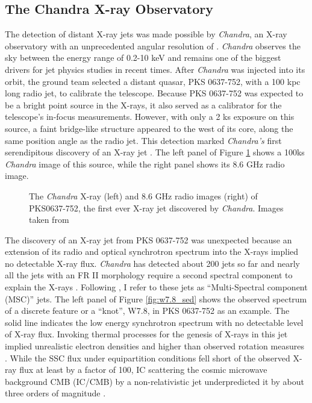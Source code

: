 \subsection{The Chandra X-ray Observatory}
The detection of distant X-ray jets was made possible by \textit{Chandra}, an X-ray observatory with an unprecedented angular resolution of \as. \textit{Chandra} observes the sky between the energy range of 0.2-10 keV and remains one of the biggest drivers for jet physics studies in recent times. After \textit{Chandra} was injected into its orbit, the ground team selected a distant quasar, PKS 0637-752, with a 100 kpc long radio jet, to calibrate the telescope. Because PKS 0637-752 was expected to be a bright point source in the X-rays, it also served as a calibrator for the telescope's in-focus measurements. However, with only a 2 ks exposure on this source, a faint bridge-like structure appeared to the west of its core, along the same position angle as the radio jet. This detection marked \textit{Chandra's} first serendipitous discovery of an X-ray jet \citep{chartas2000chandra}. The left panel of Figure \ref{fig:pks0637-752_show_piece} shows a 100ks \textit{Chandra} image of this source, while the right panel shows its 8.6 GHz radio image.

\begin{figure}
    \caption{The \textit{Chandra} X-ray (left) and 8.6 GHz radio images (right) of PKS0637-752, the first ever X-ray jet discovered by \textit{Chandra}. Images taken from \citet{chartas2000chandra}    \label{fig:pks0637-752_show_piece} }
\end{figure}
The discovery of an X-ray jet from PKS 0637-752 was unexpected because an extension of its radio and optical synchrotron spectrum into the X-rays implied no detectable X-ray flux. \textit{Chandra} has detected about 200 jets so far and nearly all the jets with an FR II morphology require a second spectral component to explain the X-rays \citep[e.g.,][]{sambruna2004survey,marshall2005chandra,2011ApJ...730...92H,2011ApJS..193...15M,marshall2018x}. Following \citep{breiding2017fermi}, I refer to these jets as ``Multi-Spectral component (MSC)'' jets. The left panel of Figure \ref{fig:w7.8_sed} shows the observed spectrum of a discrete feature or a ``knot'', W7.8, in PKS 0637-752 as an example. The solid line indicates the low energy synchrotron spectrum with no detectable level of X-ray flux. Invoking thermal processes for the genesis of X-rays in this jet implied unrealistic electron densities and higher than observed rotation measures \citep{schwartz2000chandra}. While the SSC flux under equipartition conditions fell short of the observed X-ray flux at least by a factor of 100, IC scattering the cosmic microwave background CMB (IC/CMB) by a non-relativistic jet underpredicted it by about three orders of magnitude \citep{chartas2000chandra}. 

